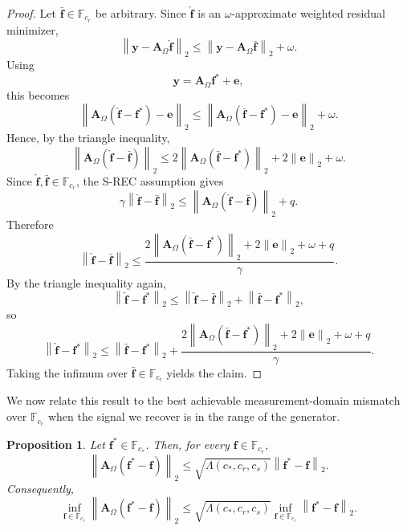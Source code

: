 \documentclass{article}
\theoremstyle{plain}
\newtheorem{proposition}[theorem]{Proposition}
\theoremstyle{definition}
\theoremstyle{remark}
\begin{document}
\begin{proof}[Proof]
  Let $\bar{\mathbf f}\in\mathbb{F}_{c_r}$ be arbitrary. Since $\widehat{\mathbf f}$ is an $\omega$-approximate weighted residual minimizer,
  \[
    \left\|
    \mathbf y
    -
    \mathbf A_\Omega\widehat{\mathbf f}
    \right\|_2
    \le
    \left\|
    \mathbf y
    -
    \mathbf A_\Omega\bar{\mathbf f}
    \right\|_2
    +
    \omega.
  \]
  Using
  \[
    \mathbf y
    =
    \mathbf A_\Omega\mathbf f^*+\mathbf e,
  \]
  this becomes
  \[
    \left\|
    \mathbf A_\Omega\left(\widehat{\mathbf f}-\mathbf f^*\right)
    -
    \mathbf e
    \right\|_2
    \le
    \left\|
    \mathbf A_\Omega\left(\bar{\mathbf f}-\mathbf f^*\right)
    -
    \mathbf e
    \right\|_2
    +
    \omega.
  \]
  Hence, by the triangle inequality,
  \[
    \left\|
    \mathbf A_\Omega\left(\widehat{\mathbf f}-\bar{\mathbf f}\right)
    \right\|_2
    \le
    2
    \left\|
    \mathbf A_\Omega\left(\bar{\mathbf f}-\mathbf f^*\right)
    \right\|_2
    +
    2\left\|\mathbf e\right\|_2
    +
    \omega.
  \]
  Since $\widehat{\mathbf f},\bar{\mathbf f}\in\mathbb{F}_{c_r}$, the S-REC assumption gives
  \[
    \gamma\left\|\widehat{\mathbf f}-\bar{\mathbf f}\right\|_2
    \le
    \left\|
    \mathbf A_\Omega\left(\widehat{\mathbf f}-\bar{\mathbf f}\right)
    \right\|_2
    +
    q.
  \]
  Therefore
  \[
    \left\|\widehat{\mathbf f}-\bar{\mathbf f}\right\|_2
    \le
    \frac{
      2
      \left\|
      \mathbf A_\Omega\left(\bar{\mathbf f}-\mathbf f^*\right)
      \right\|_2
      +
      2\left\|\mathbf e\right\|_2
      +
      \omega
      +
      q
    }{\gamma}.
  \]
  By the triangle inequality again,
  \[
    \left\|\widehat{\mathbf f}-\mathbf f^*\right\|_2
    \le
    \left\|\widehat{\mathbf f}-\bar{\mathbf f}\right\|_2
    +
    \left\|\bar{\mathbf f}-\mathbf f^*\right\|_2,
  \]
  so
  \[
    \left\|\widehat{\mathbf f}-\mathbf f^*\right\|_2
    \le
    \left\|\bar{\mathbf f}-\mathbf f^*\right\|_2
    +
    \frac{
      2
      \left\|
      \mathbf A_\Omega\left(\bar{\mathbf f}-\mathbf f^*\right)
      \right\|_2
      +
      2\left\|\mathbf e\right\|_2
      +
      \omega
      +
      q
    }{\gamma}.
  \]
  Taking the infimum over $\bar{\mathbf f}\in\mathbb{F}_{c_r}$ yields the claim.
\end{proof}

We now relate this result to the best achievable measurement-domain mismatch over $\mathbb{F}_{c_r}$ when the signal we recover is in the range of the generator.

\begin{proposition}
  \label{prop:cross-class-meas-sig}
  Let $\mathbf f^*\in \mathbb F_{c_*}$. Then, for every
  $\mathbf f\in\mathbb F_{c_r}$,
  \[
    \left\|
    \mathbf A_\Omega\left(\mathbf f^*-\mathbf f\right)
    \right\|_2
    \leq
    \sqrt{\Lambda(c_*,c_r,c_s)}
    \left\|
    \mathbf f^*-\mathbf f
    \right\|_2.
  \]
  Consequently,
  \[
    \inf_{\mathbf f\in\mathbb F_{c_r}}
    \left\|
    \mathbf A_\Omega\left(\mathbf f^*-\mathbf f\right)
    \right\|_2
    \leq
    \sqrt{\Lambda(c_*,c_r,c_s)}
    \inf_{\mathbf f\in\mathbb F_{c_r}}
    \left\|
    \mathbf f^*-\mathbf f
    \right\|_2.
  \]
\end{proposition}
\end{document}
